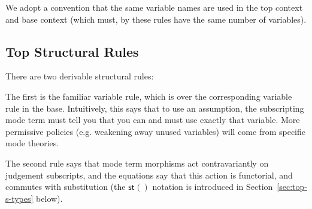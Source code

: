 \documentclass[10pt]{article}
\theoremstyle{definition}
\newcommand{\yields}{\vdash}
\newcommand{\tcell}{\Rightarrow}
\newcommand{\CTX}{\,\,\mathsf{Ctx}}
\newcommand{\ctx}{\,\,\mathsf{mctx}}
\newcommand{\TYPE}{\,\,\mathsf{Type}}
\newcommand{\type}{\,\,\mathsf{mode}}
\newcommand{\id}{\mathsf{id}}
\newcommand{\rewrite}[2]{\overleftarrow{#1}(#2)}
\newcommand\StI[2]{\ensuremath{\mathsf{st}_{#1}(#2)}}
\newcommand\TermTwoT[5]{\ensuremath{#1 \vdash {#2} : #3 \tcell_{#5} #4}}
\newcommand\ap[2]{\ensuremath{#1 \langle #2 \rangle }}
\begin{document}

We adopt a convention that the same variable names are used in the top
context and base context (which must, by these rules have the same
number of variables).  

\subsection{Top Structural Rules}
\label{sec:top-syntax-structural}

There are two derivable structural rules: 

The first is the familiar variable rule, which is over the corresponding
variable rule in the base.  Intuitively, this says that to use an
assumption, the subscripting mode term must tell you that you can and
must use exactly that variable.  More permissive policies
(e.g. weakening away unused variables) will come from specific mode
theories.

The second rule says that mode term morphisms act contravariantly on
judgement subscripts, and the equations say that this action is
functorial, and commutes with substitution (the $\StI{}{}$ notation is
introduced in Section~\ref{sec:top-s-types} below).
\end{document}
